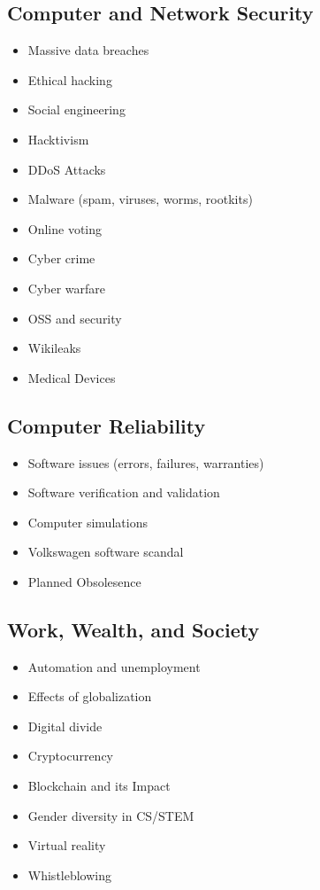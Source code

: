 \documentclass[12pt,a4paper]{report}
\begin{document}
\subsection*{Computer and Network Security}
\begin{itemize}
\item Massive data breaches
\item Ethical hacking
\item Social engineering
\item Hacktivism
\item DDoS Attacks
\item Malware (spam, viruses, worms, rootkits)
\item Online voting
\item Cyber crime
\item Cyber warfare
\item OSS and security
\item Wikileaks
\item Medical Devices
\end{itemize}

\subsection*{Computer Reliability}
\begin{itemize}
\item Software issues (errors, failures, warranties)
\item Software verification and validation
\item Computer simulations
\item Volkswagen software scandal
\item Planned Obsolesence
\end{itemize}

\subsection*{Work, Wealth, and Society}
\begin{itemize}
\item Automation and unemployment
\item Effects of globalization
\item Digital divide
\item Cryptocurrency
\item Blockchain and its Impact
\item Gender diversity in CS/STEM
\item Virtual reality
\item Whistleblowing
\end{itemize}
\end{document}
